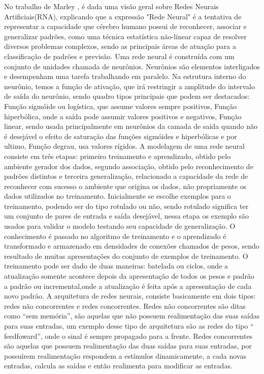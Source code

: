 No trabalho de Marley \cite{Marley}, é dada uma visão geral sobre Redes Neurais Artificiais(RNA), explicando que a expressão "Rede Neural" é a tentativa de representar a capacidade que cérebro humano possui de reconhecer, associar e generalizar padrões, como uma técnica estatística não-linear capaz de resolver diversos problemas complexos, sendo as principais áreas de atuação para a classificação de padrões e previsão. Uma rede neural é construída com um conjunto de unidades chamada de neurônios. Neurônios são elementos interligados e desempenham uma tarefa trabalhando em paralelo. 
Na estrutura interno do neurônio, temos a função de ativação, que irá restringir a amplitude do intervalo de saída do neurônio, sendo quadro tipos principais que podem ser destacados: Função sigmóide ou logística, que assume valores sempre positivos, Função hiperbólica, onde a saída pode assumir valores positivos e negativos, Função linear, sendo usada principalmente em neurônios da camada de saída quando não é desejável o efeito de saturação das funções sigmóides e hiperbólicas e por ultimo, Função degrau, usa valores rígidos. 
A modelagem de uma rede neural consiste em três etapas: primeiro treinamento e aprendizado, obtido pelo ambiente gerador dos dados, segundo associação, obtido pelo reconhecimento de padrões distintos e terceira generalização, relacionado a capacidade da rede de reconhecer com sucesso o ambiente que origina os dados, não propriamente os dados utilizados no treinamento. Inicialmente se escolhe exemplos para o treinamento, podendo ser do tipo rotulado ou não, sendo rotulado significa ter um conjunto de pares de entrada e saída desejável, nessa etapa os exemplo são usados para validar o modelo testando seu capacidade de generalização. O conhecimento é passado no algoritmo de treinamento e o aprendizado é transformado e armazenado em densidades de conexões chamados de pesos, sendo resultado de muitas apresentações do conjunto de exemplos de treinamento. O treinamento pode ser dado de duas maneiras: batelada ou ciclos, onde a atualização somente acontece depois da apresentação de todos os pesos e padrão a padrão ou incremental,onde a atualização é feita após a apresentação de cada novo padrão. 
A arquitetura de redes neurais, consiste basicamente em dois tipos: redes não concorrentes e redes concorrentes. 
Redes não concorrentes são ditas como “sem memória”, são aquelas que não possuem realimentação das suas saídas para suas entradas, um exemplo desse tipo de arquitetura são as redes do tipo “ feedfoward”, onde o sinal é sempre propagado para a frente.
Redes concorrentes são aquelas que possuem realimentação das duas saídas para suas entradas, por possuírem realimentação respondem a estímulos dinamicamente, a cada novas entradas, calcula as saídas e então realimenta para modificar as entradas.

